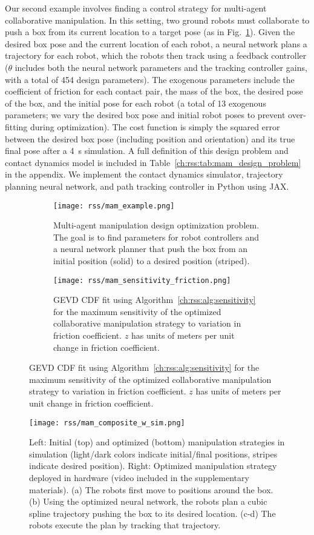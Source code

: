 Our second example involves finding a control strategy for multi-agent collaborative manipulation. In this setting, two ground robots must collaborate to push a box from its current location to a target pose (as in Fig.~\ref{ch:rss:fig:mam_example}). Given the desired box pose and the current location of each robot, a neural network plans a trajectory for each robot, which the robots then track using a feedback controller ($\theta$ includes both the neural network parameters and the tracking controller gains, with a total of 454 design parameters). The exogenous parameters include the coefficient of friction for each contact pair, the mass of the box, the desired pose of the box, and the initial pose for each robot (a total of 13 exogenous parameters; we vary the desired box pose and initial robot poses to prevent over-fitting during optimization). The cost function is simply the squared error between the desired box pose (including position and orientation) and its true final pose after a \SI{4}{s} simulation. A full definition of this design problem and contact dynamics model is included in Table~\ref{ch:rss:tab:mam_design_problem} in the appendix. We implement the contact dynamics simulator, trajectory planning neural network, and path tracking controller in Python using JAX.

\begin{figure}[tb]
    \centering
    \begin{subfigure}[c]{0.45\linewidth}
        \centering
        \texttt{[image: rss/mam\_example.png]}
        \caption{Multi-agent manipulation design optimization problem. The goal is to find parameters for robot controllers and a neural network planner that push the box from an initial position (solid) to a desired position (striped).}
        \label{ch:rss:fig:mam_example}
    \end{subfigure}
    \quad
    \begin{subfigure}[c]{0.45\linewidth}
        \centering
        \texttt{[image: rss/mam\_sensitivity\_friction.png]}
        \caption{GEVD CDF fit using Algorithm~\ref{ch:rss:alg:sensitivity} for the maximum sensitivity of the optimized collaborative manipulation strategy to variation in friction coefficient. $z$ has units of meters per unit change in friction coefficient.}
        \label{ch:rss:fig:mam_gevd}
    \end{subfigure}
\end{figure}

\begin{figure}[tb]
    \centering
    \texttt{[image: rss/mam\_composite\_w\_sim.png]}
    \caption{Left: Initial (top) and optimized (bottom) manipulation strategies in simulation (light/dark colors indicate initial/final positions, stripes indicate desired position). Right: Optimized manipulation strategy deployed in hardware (video included in the supplementary materials). (a) The robots first move to positions around the box. (b) Using the optimized neural network, the robots plan a cubic spline trajectory pushing the box to its desired location. (c-d) The robots execute the plan by tracking that trajectory.}
    \label{ch:rss:fig:mam_hw}
\end{figure}


